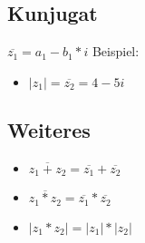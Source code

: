 \documentclass[12pt]{article}
\begin{document}
    \subsection{Kunjugat}

    $\overline{z_1} = a_1 - b_1 * i$ \newline
    \newline
    Beispiel:
    \begin{itemize}
        \item $|z_1| = \overline{z_2} = 4 - 5i$
    \end{itemize}

    \subsection{Weiteres}
    \begin{itemize}
        \item $ \overline{z_1 + z_2} = \overline{z_1} + \overline{z_2}$
        \item $ \overline{z_1 * z_2} = \overline{z_1} * \overline{z_2}$
        \item $|z_1 * z_2| = |z_1| * |z_2|$
    \end{itemize}
\end{document}
